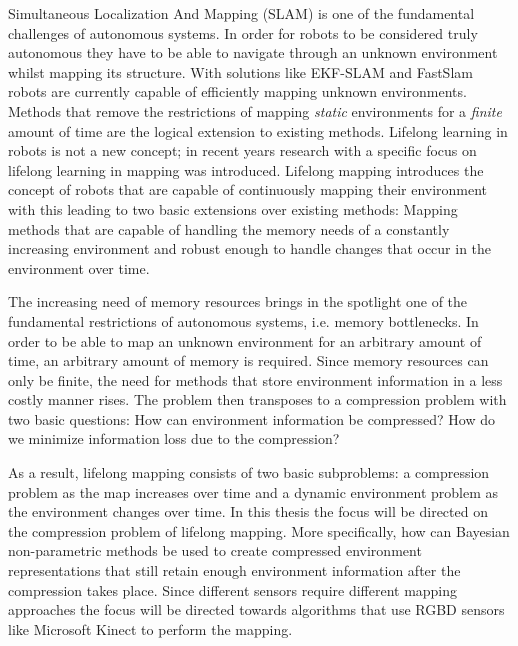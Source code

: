 \documentclass [twoside,hidelinks]{article}
\begin{document}
Simultaneous Localization And Mapping (SLAM) is one of the fundamental challenges of autonomous systems\cite{probRobs}. 
In order for robots to be considered truly autonomous they have to be able to navigate through an unknown environment whilst mapping its structure.
With solutions like EKF-SLAM\cite{ekf} and FastSlam\cite{SLAM} robots are currently capable of efficiently mapping unknown environments. 
Methods that remove the restrictions of mapping \textit{static} environments for a \textit{finite} amount of time are the logical extension to existing methods.
Lifelong learning in robots is not a new concept\cite{liflonglearning}; in recent years research with a specific focus on lifelong learning in mapping\cite{lifelongmaps} was introduced.  Lifelong mapping introduces the concept of robots that are capable of continuously mapping their environment with this leading to two basic extensions over existing methods: Mapping methods that are capable of handling the memory needs of a constantly increasing environment and robust enough to handle changes that occur in the environment over time. 

The increasing need of memory resources brings in the spotlight one of the fundamental restrictions of autonomous systems, i.e. memory bottlenecks. In order to be able to map an unknown environment for an arbitrary amount of time, an arbitrary amount of memory is required. Since memory resources can only be finite, the need for methods that store environment information in a less costly manner rises. The problem then transposes to a compression problem with two basic questions: How can environment information be compressed? How do we minimize information loss due to the compression?

As a result, lifelong mapping consists of two basic subproblems: a compression problem as the map increases over time and a dynamic environment problem as the environment changes over time\cite{aishalong}. In this thesis the focus will be directed on the compression problem of lifelong mapping. More specifically, how can Bayesian non-parametric methods be used to create compressed environment representations that still retain enough environment information after the compression takes place. Since different sensors require different mapping approaches the focus will be directed towards algorithms that use RGBD sensors like Microsoft Kinect to perform the mapping. 
\end{document}
